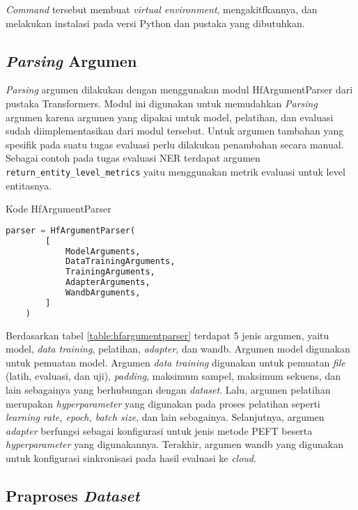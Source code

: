 \textit{Command} tersebut  membuat \textit{virtual environment}, mengakitfkannya, dan melakukan instalasi pada versi Python dan pustaka yang dibutuhkan.

\subsection{\textit{Parsing} Argumen}
\label{sec:parse-arg}

\textit{Parsing} argumen dilakukan dengan menggunakan modul HfArgumentParser dari pustaka Transformers. Modul ini digunakan untuk memudahkan \textit{Parsing} argumen karena argumen yang dipakai untuk model, pelatihan, dan evaluasi sudah diimplementasikan dari modul tersebut. Untuk argumen tambahan yang spesifik pada suatu tugas evaluasi perlu dilakukan penambahan secara manual. Sebagai contoh pada tugas evaluasi NER terdapat argumen \texttt{return\_entity\_level\_metrics} yaitu menggunakan metrik evaluasi untuk level entitasnya.

\begin{table}[h]
    \caption{Kode HfArgumentParser}
    \label{table:hfargumentparser}
    \begin{lstlisting}[language=python]
    parser = HfArgumentParser(
        [
            ModelArguments,
            DataTrainingArguments,
            TrainingArguments,
            AdapterArguments,
            WandbArguments,
        ]
    )
    \end{lstlisting}
\end{table}

Berdasarkan tabel \ref{table:hfargumentparser} terdapat 5 jenis argumen, yaitu model, \textit{data training}, pelatihan, \textit{adapter}, dan wandb. Argumen model digunakan untuk pemuatan model. Argumen \textit{data training} digunakan untuk pemuatan \textit{file} (latih, evaluasi, dan uji), \textit{padding}, maksimum sampel, maksimum sekuens, dan lain sebagainya yang berhubungan dengan \textit{dataset}. Lalu, argumen pelatihan merupakan \textit{hyperparameter} yang digunakan pada proses pelatihan seperti \textit{learning rate, epoch, batch size}, dan lain sebagainya. Selanjutnya, argumen \textit{adapter} berfungsi sebagai konfigurasi untuk jenis metode PEFT beserta \textit{hyperparameter} yang digunakannya. Terakhir, argumen wandb yang digunakan untuk konfigurasi sinkronisasi pada hasil evaluasi ke \textit{cloud}.

\subsection{Praproses \textit{Dataset}}
\label{sec:praproses}

